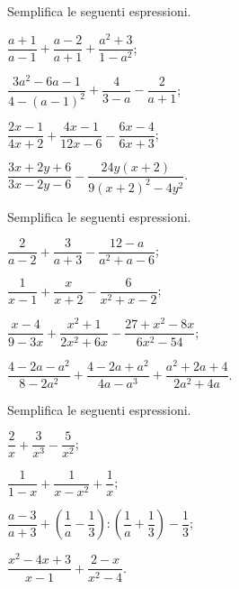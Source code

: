 \begin{esercizio}[\Ast]
\label{ese:14.30}
Semplifica le seguenti espressioni.
\begin{multicols}{2}
\begin{enumeratea}
 \item $\dfrac{a+1}{a-1}+\dfrac{a-2}{a+1}+\dfrac{a^{2}+3}{1-a^{2}}$;
 \item $\dfrac{3a^{2}-6a-1}{4-(a-1)^{2}}+\dfrac{4}{3-a}-\dfrac{2}{a+1}$;
 \item $\dfrac{2x-1}{4x+2}+\dfrac{4x-1}{12x-6}-\dfrac{6x-4}{6x+3}$;
 \item $\dfrac{3x+2y+6}{3x-2y-6}-\dfrac{24y(x+2)}{9(x+2)^{2}-4y^{2}}$.
\end{enumeratea}
\end{multicols}
\end{esercizio}

\begin{esercizio}[\Ast]
\label{ese:14.31}
Semplifica le seguenti espressioni.
\begin{enumeratea}
 \item $\dfrac{2}{a-2}+\dfrac{3}{a+3}-\dfrac{12-a}{a^{2}+a-6}$;
 \item $\dfrac{1}{x-1}+\dfrac{x}{x+2}-\dfrac{6}{x^{2}+x-2}$;
 \item $\dfrac{x-4}{9-3x}+\dfrac{x^{2}+1}{2x^{2}+6x}-\dfrac{27+x^{2}-8x}{6x^{2}-54}$;
 \item $\dfrac{4-2a-a^{2}}{8-2a^{2}}+\dfrac{4-2a+a^{2}}{4a-a^{3}}+\dfrac{a^{2}+2a+4}{2a^{2}+4a}$.
\end{enumeratea}
\end{esercizio}

\begin{esercizio}[\Ast]
\label{ese:14.32}
Semplifica le seguenti espressioni.
\begin{multicols}{2}
\begin{enumeratea}
 \item $\dfrac{2}{x}+\dfrac{3}{x^{3}}-\dfrac{5}{x^{2}}$;
 \item $\dfrac{1}{1-x}+\dfrac{1}{x-x^{2}}+\dfrac{1}{x}$;
 \item $\dfrac{a-3}{a+3}+\left(\dfrac{1}{a}-\dfrac{1}{3}\right):\left(\dfrac{1}{a}+\dfrac{1}{3}\right)-\dfrac{1}{3}$;
 \item $\dfrac{x^{2}-4x+3}{x-1}+\dfrac{2-x}{x^{2}-4}$.
\end{enumeratea}
\end{multicols}
\end{esercizio}

